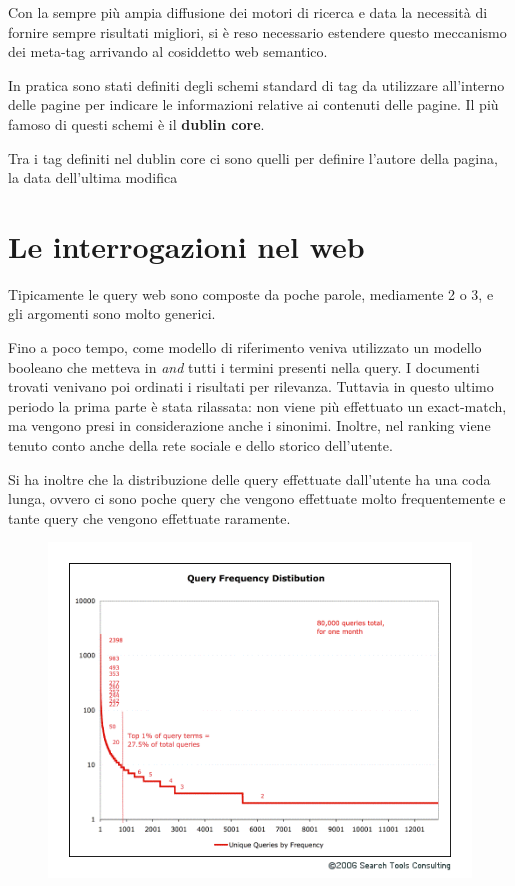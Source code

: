 Con la sempre più ampia diffusione dei motori di ricerca e data la necessità di fornire sempre risultati migliori, si è reso necessario estendere questo meccanismo dei meta-tag arrivando al cosiddetto web semantico.

In pratica sono stati definiti degli schemi standard di tag da utilizzare all'interno delle pagine per indicare le informazioni relative ai contenuti delle pagine.
Il più famoso di questi schemi è il \textbf{dublin core}.

Tra i tag definiti nel dublin core ci sono quelli per definire l'autore della pagina, la data dell'ultima modifica 

\section{Le interrogazioni nel web}

Tipicamente le query web sono composte da poche parole, mediamente 2 o 3, e gli argomenti sono molto generici.

Fino a poco tempo, come modello di riferimento veniva utilizzato un modello booleano che metteva in \textit{and} tutti i termini presenti nella query. I documenti trovati venivano poi ordinati i risultati per rilevanza.
Tuttavia in questo ultimo periodo la prima parte è stata rilassata: non viene più effettuato un exact-match, ma vengono presi in considerazione anche i sinonimi. Inoltre, nel ranking viene tenuto conto anche della rete sociale e dello storico dell'utente.

Si ha inoltre che la distribuzione delle query effettuate dall'utente ha una coda lunga, ovvero ci sono poche query che vengono effettuate molto frequentemente e tante query che vengono effettuate raramente.

\begin{figure}[htbp]
	\centering
	\includegraphics[width=.6\textwidth]{images/l18-fig-1.png}
\end{figure}


